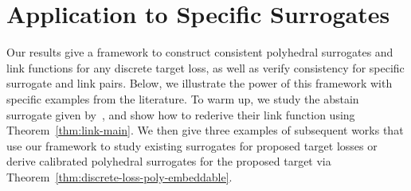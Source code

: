 \documentclass[11pt]{article}
\newcommand{\prop}[1]{\mathrm{prop}[#1]}
\begin{document}
\section{Application to Specific Surrogates}\label{sec:applications}

Our results give a framework to construct consistent polyhedral surrogates and link functions for any discrete target loss, as well as verify consistency for specific surrogate and link pairs.
Below, we illustrate the power of this framework with specific examples from the literature.
To warm up, we study the abstain surrogate given by~\citet{ramaswamy2018consistent}, and show how to rederive their link function using Theorem~\ref{thm:link-main}.
We then give three examples of subsequent works that use our framework to study existing surrogates for proposed target losses or derive calibrated polyhedral surrogates for the proposed target via Theorem~\ref{thm:discrete-loss-poly-embeddable}.
\end{document}
